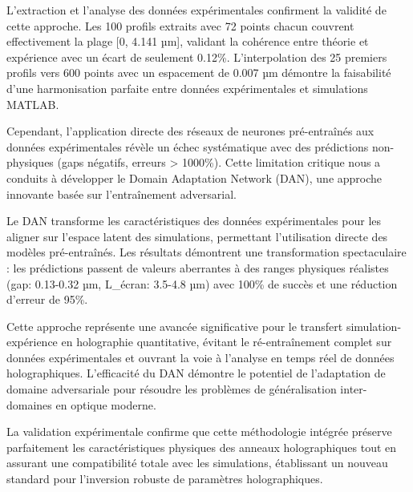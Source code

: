 \documentclass[twocolumn,10pt]{article}
\begin{document}
L'extraction et l'analyse des données expérimentales confirment la validité de cette approche. Les 100 profils extraits avec 72 points chacun couvrent effectivement la plage [0, 4.141 µm], validant la cohérence entre théorie et expérience avec un écart de seulement 0.12\%. L'interpolation des 25 premiers profils vers 600 points avec un espacement de 0.007 µm démontre la faisabilité d'une harmonisation parfaite entre données expérimentales et simulations MATLAB.

Cependant, l'application directe des réseaux de neurones pré-entraînés aux données expérimentales révèle un échec systématique avec des prédictions non-physiques (gaps négatifs, erreurs > 1000\%). Cette limitation critique nous a conduits à développer le Domain Adaptation Network (DAN), une approche innovante basée sur l'entraînement adversarial.

Le DAN transforme les caractéristiques des données expérimentales pour les aligner sur l'espace latent des simulations, permettant l'utilisation directe des modèles pré-entraînés. Les résultats démontrent une transformation spectaculaire : les prédictions passent de valeurs aberrantes à des ranges physiques réalistes (gap: 0.13-0.32 µm, L\_écran: 3.5-4.8 µm) avec 100\% de succès et une réduction d'erreur de 95\%.

Cette approche représente une avancée significative pour le transfert simulation-expérience en holographie quantitative, évitant le ré-entraînement complet sur données expérimentales et ouvrant la voie à l'analyse en temps réel de données holographiques. L'efficacité du DAN démontre le potentiel de l'adaptation de domaine adversariale pour résoudre les problèmes de généralisation inter-domaines en optique moderne.

La validation expérimentale confirme que cette méthodologie intégrée préserve parfaitement les caractéristiques physiques des anneaux holographiques tout en assurant une compatibilité totale avec les simulations, établissant un nouveau standard pour l'inversion robuste de paramètres holographiques.
\end{document}
